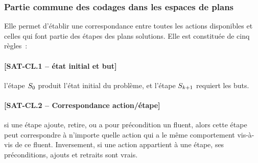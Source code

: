 {\color{red}

\subsubsection{Partie commune des codages dans les espaces de plans}

Elle permet d'établir une correspondance entre toutes les actions disponibles et
celles qui font partie des étapes des plans solutions. Elle est constituée
de cinq règles~:


\paragraph*{[SAT-CL.1 -- état initial et but]} l'étape $S_{0}$ produit l'état
  initial du problème, et l'étape $S_{k+1}$ requiert les buts.
\paragraph*{[SAT-CL.2 -- Correspondance action/étape]} si une étape ajoute, retire, ou a
  pour précondition un fluent, alors cette étape peut correspondre à n'importe
  quelle action qui a le même comportement vis-à-vis de ce fluent. Inversement,
  si une action appartient à une étape, ses préconditions, ajouts et retraits
  sont vrais.


}
